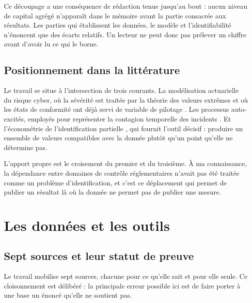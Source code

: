 \documentclass[12pt,a4paper]{article}
\theoremstyle{definition}
\begin{document}
Ce découpage a une conséquence de rédaction tenue jusqu'au bout : aucun niveau de
capital agrégé n'apparaît dans le mémoire avant la partie consacrée aux résultats.
Les parties qui établissent les données, le modèle et l'identifiabilité n'énoncent
que des écarts relatifs. Un lecteur ne peut donc pas prélever un chiffre avant
d'avoir lu ce qui le borne.

\subsection{Positionnement dans la littérature}
\label{ss:litterature}

Le travail se situe à l'intersection de trois courants. La modélisation
actuarielle du risque cyber, où la sévérité est traitée par la théorie des valeurs
extrêmes \citep{elingwirfs2019,HerathHerath2011} et où les états de conformité ont
déjà servi de variable de pilotage \citep{HillairetLopez2021}. Les processus
auto-excités, employés pour représenter la contagion temporelle des incidents
\citep{BessyRolandBoumezouedHillairet2021,BoumezouedCherkaouiHillairet2023}. Et
l'économétrie de l'identification partielle \citep{Manski1990,Tamer2010}, qui
fournit l'outil décisif : produire un ensemble de valeurs compatibles avec la
donnée plutôt qu'un point qu'elle ne détermine pas.

L'apport propre est le croisement du premier et du troisième. À ma connaissance,
la dépendance entre domaines de contrôle réglementaires n'avait pas été traitée
comme un problème d'identification, et c'est ce déplacement qui permet de publier
un résultat là où la donnée ne permet pas de publier une mesure.

\section{Les données et les outils}
\label{s:donnees}

\subsection{Sept sources et leur statut de preuve}
\label{ss:sources}

Le travail mobilise sept sources, chacune pour ce qu'elle sait et pour elle seule.
Ce cloisonnement est délibéré : la principale erreur possible ici est de faire
porter à une base un énoncé qu'elle ne soutient pas.
\end{document}
